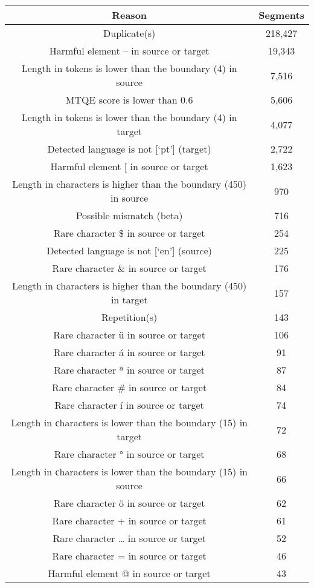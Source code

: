 \begin{longtable}{cc}
\label{tab:cleaning-reasons-complete} \\
\toprule 
\textbf{Reason} & \textbf{Segments} \\
\midrule 
Duplicate(s) & 218,427 \\
Harmful element -- in source or target & 19,343 \\
Length in tokens is lower than the boundary (4) in source & 7,516 \\
MTQE score is lower than 0.6 & 5,606 \\
Length in tokens is lower than the boundary (4) in target & 4,077 \\
Detected language is not [`pt'] (target) & 2,722 \\
Harmful element [ in source or target & 1,623 \\
Length in characters is higher than the boundary (450) in source & 970 \\
Possible mismatch (beta) & 716 \\
Rare character \$ in source or target & 254 \\
Detected language is not [`en'] (source) & 225 \\
Rare character \& in source or target & 176 \\
Length in сharacters is higher than the boundary (450) in target & 157 \\
Repetition(s) & 143 \\
Rare character ü in source or target & 106 \\
Rare character á in source or target & 91 \\
Rare character ª in source or target & 87 \\
Rare character \# in source or target & 84 \\
Rare character í in source or target & 74 \\
Length in сharacters is lower than the boundary (15) in target & 72 \\ 
Rare character ° in source or target & 68 \\
Length in сharacters is lower than the boundary (15) in source & 66 \\
Rare character ö in source or target & 62 \\
Rare character + in source or target & 61 \\
Rare character … in source or target & 52 \\
Rare character = in source or target & 46 \\
Harmful element @ in source or target & 43 \\

\end{longtable}
